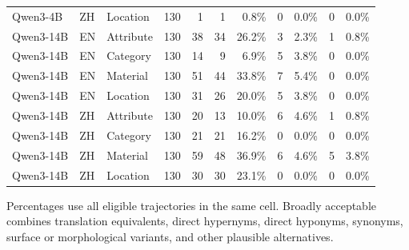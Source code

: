 \begin{table}[t]
{\begin{tabular}{lllrrrrrrrr}
        Qwen3-4B & ZH & Location & 130 & 1 & 1 & 0.8\% & 0 & 0.0\% & 0 & 0.0\% \\
        \addlinespace
        Qwen3-14B & EN & Attribute & 130 & 38 & 34 & 26.2\% & 3 & 2.3\% & 1 & 0.8\% \\
        Qwen3-14B & EN & Category & 130 & 14 & 9 & 6.9\% & 5 & 3.8\% & 0 & 0.0\% \\
        Qwen3-14B & EN & Material & 130 & 51 & 44 & 33.8\% & 7 & 5.4\% & 0 & 0.0\% \\
        Qwen3-14B & EN & Location & 130 & 31 & 26 & 20.0\% & 5 & 3.8\% & 0 & 0.0\% \\
        Qwen3-14B & ZH & Attribute & 130 & 20 & 13 & 10.0\% & 6 & 4.6\% & 1 & 0.8\% \\
        Qwen3-14B & ZH & Category & 130 & 21 & 21 & 16.2\% & 0 & 0.0\% & 0 & 0.0\% \\
        Qwen3-14B & ZH & Material & 130 & 59 & 48 & 36.9\% & 6 & 4.6\% & 5 & 3.8\% \\
        Qwen3-14B & ZH & Location & 130 & 30 & 30 & 23.1\% & 0 & 0.0\% & 0 & 0.0\% \\
        \bottomrule
    \end{tabular}%
    }
    \vspace{0.5em}
    \parbox{0.98\textwidth}{\footnotesize Percentages use all eligible trajectories in the same cell. Broadly acceptable combines translation equivalents, direct hypernyms, direct hyponyms, synonyms, surface or morphological variants, and other plausible alternatives.}
\end{table}

